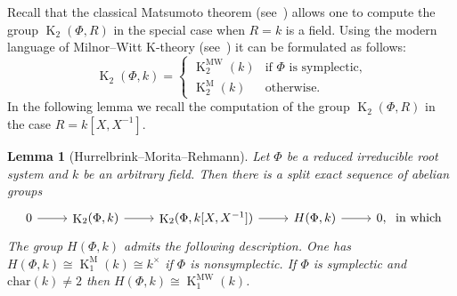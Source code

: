 \documentclass[oneside, 8pt]{amsart}
\newtheorem{lemma}{Lemma}
\theoremstyle{remark}
\theoremstyle{definition}
\numberwithin{lemma}{section}
\numberwithin{prop}{section}
\numberwithin{corollary}{section}
\numberwithin{externaltheorem}{section}
\DeclareMathOperator{\K}{K}
\newcommand{\inv}{^{-1}}
\numberwithin{equation}{section}
\begin{document}
Recall that the classical Matsumoto theorem (see~\cite[Theorem~5.10]{Ma69}) allows one to compute the group $\K_2(\Phi, R)$ in the special case when $R=k$ is a field.
Using the modern language of Milnor--Witt K-theory (see~\cite{Mo04}) it can be formulated as follows:
\begin{equation*} \K_2(\Phi, k) = \left\{\begin{array}{ll} \K_2^\mathrm{MW}(k)& \text{if $\Phi$ is symplectic,}\\ \K_2^\mathrm{M}(k) & \text{otherwise.}\end{array}\right. \end{equation*}
In the following lemma we recall the computation of the group $\K_2(\Phi, R)$ in the case $R=k[X, X\inv]$.
\begin{lemma}[Hurrelbrink--Morita--Rehmann]\label{K2-laurent-field} Let $\Phi$ be a reduced irreducible root system and $k$ be an arbitrary field. Then there is a split exact sequence of abelian groups
\[\begin{tikzcd} 0 \arrow{r} & \K_2(\Phi, k) \arrow{r} & \K_2(\Phi, k[X, X^{-1}]) \arrow{r} & H(\Phi, k) \arrow{r} & 0, \end{tikzcd}\text{ in which}\]
The group $H(\Phi, k)$ admits the following description. One has $H(\Phi, k) \cong \K_1^\mathrm{M}(k) \cong k^\times$ if $\Phi$ is nonsymplectic. If $\Phi$ is symplectic and $\mathrm{char}(k)\neq 2$ then $H(\Phi, k) \cong \K_1^\mathrm{MW}(k)$. \end{lemma}
\end{document}
